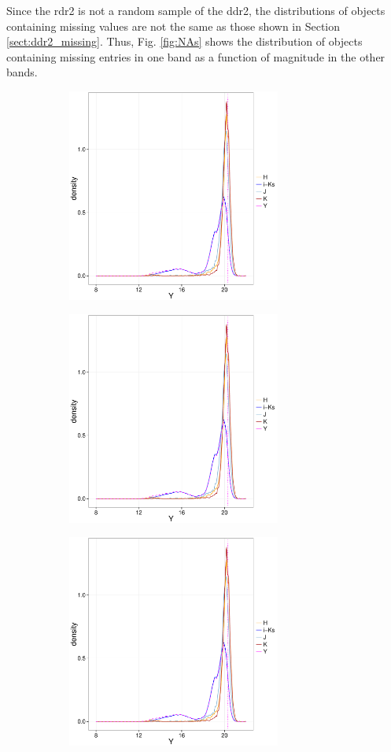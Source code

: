 Since the \gls{rdr2} is not a random sample of the \gls{ddr2}, the distributions of objects containing missing values are not the same as those shown in Section \ref{sect:ddr2_missing}. Thus, Fig. \ref{fig:NAs} shows the distribution of objects containing missing entries in one band as a function of magnitude in the other bands. 

\begin{figure}[ht!]
    \centering
    \begin{subfigure}[t]{0.45\textwidth}
        \includegraphics[page=1,height=7cm]{background/Figures/MissingDistributions.pdf}
    \end{subfigure}
    \begin{subfigure}[t]{0.45\textwidth}
      \includegraphics[page=2,height=7cm]{background/Figures/MissingDistributions.pdf}
    \end{subfigure}
     \begin{subfigure}[t]{0.45\textwidth}
      \includegraphics[page=3,height=7cm]{background/Figures/MissingDistributions.pdf}

\end{subfigure}
\end{figure}
